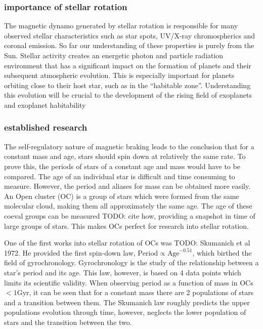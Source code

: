 \documentclass[fleqn,usenatbib]{mnras}
\begin{document}
\subsubsection{importance of stellar rotation}
The magnetic dynamo generated by stellar rotation is responsible for many observed stellar characteristics such as star spots, UV/X-ray chromospherics and coronal emission. 
So far our understanding of these properties is purely from the Sun. 
Stellar activity creates an energetic photon and particle radiation environment that has a significant impact on the formation of planets and their subsequent atmospheric evolution. 
This is especially important for planets orbiting close to their host star, such as in the “habitable zone”.
Understanding this evolution will be crucial to the development of the rising field of exoplanets and exoplanet habitability


\subsubsection{established research}
The self-regulatory nature of magnetic braking leads to the conclusion that for a constant mass and age, stars should spin down at relatively the same rate.
To prove this, the periods of stars of a constant age and mass would have to be compared.
The age of an individual star is difficult and time consuming to measure.
However, the period and aliases for mass can be obtained more easily.
An Open cluster (OC) is a group of stars which were formed from the same molecular cloud, making them all approximately the same age.
The age of these coeval groups can be measured TODO: cite how, providing a snapshot in time of large groups of stars.
This makes OCs perfect for research into stellar rotation.

One of the first works into stellar rotation of OCs was TODO: Skumanich et al 1972.
He provided the first spin-down law,  $\text{Period} \propto \text{Age}^{-0.51}$, which birthed the field of gyrochronology.
Gyrochronology is the study of the relationship between a star's period and its age.
This law, however, is based on 4 data points which limits its scientific validity.
When observing period as a function of mass in OCs $< 1\text{Gyr}$,  it can be seen that for a constant mass there are 2 populations of stars and a transition between them. 
The Skumanich law roughly predicts the upper populations evolution through time, however, neglects the lower population of stars and the transition between the two.
\end{document}
